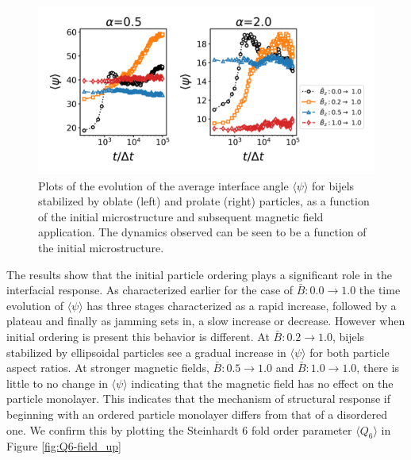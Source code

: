 \begin{figure} 
    \centering 
    \includegraphics[scale=0.6]{../figures/results/paper2/psi-field_up.png} 
    \caption{Plots of the evolution of the average interface angle \(\langle \psi \rangle\) for bijels stabilized 
             by oblate (left) and prolate (right) particles, as a function of the initial microstructure and subsequent magnetic field application.
             The dynamics observed can be seen to be a function of the initial microstructure.} 
    \label{fig:interface_angle-field_up} 
\end{figure}

The results show that the initial particle ordering plays a significant role in the interfacial response. As characterized earlier for the case of
$\bar{B}:0.0 \rightarrow 1.0$ the time evolution of $\langle \psi \rangle$ has three stages characterized as a rapid increase, followed by a plateau
and finally as jamming sets in, a slow increase or decrease. However when initial ordering is present this behavior is different. At 
$\bar{B}: 0.2 \rightarrow 1.0$, bijels stabilized by ellipsoidal particles see a gradual increase in $\langle \psi \rangle$ for both particle aspect ratios.
At stronger magnetic fields, $\bar{B}: 0.5 \rightarrow 1.0$ and $\bar{B}: 1.0 \rightarrow 1.0$, there is little to no change in $\langle \psi \rangle$ indicating
that the magnetic field has no effect on the particle monolayer. This indicates that the mechanism of structural response if beginning with an ordered particle
monolayer differs from that of a disordered one. We confirm this by plotting the Steinhardt 6 fold order parameter $\langle Q_6 \rangle$ in Figure \ref{fig:Q6-field_up}

